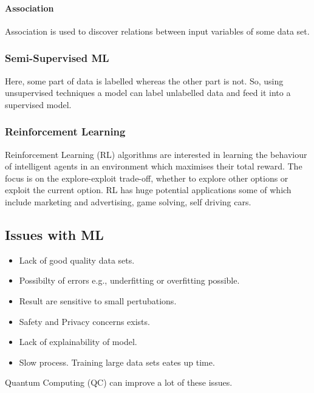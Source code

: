 \paragraph{Association}
Association is used to discover relations between input variables of some data set.
\subsubsection{Semi-Supervised ML}
Here, some part of data is labelled whereas the other part is not. So, using unsupervised techniques a model can label unlabelled data and feed it into a supervised model.
\subsubsection{Reinforcement Learning}
Reinforcement Learning (RL) algorithms are interested in learning the behaviour of intelligent agents in an environment which maximises their total reward. The focus is on the explore-exploit trade-off, whether to explore other options or exploit the current option. RL has huge potential applications some of which include marketing and advertising, game solving, self driving cars.
\subsection{Issues with ML}
\begin{itemize}
	\item Lack of good quality data sets.
	\item Possibilty of errors e.g., underfitting or overfitting possible.
	\item Result are sensitive to small pertubations.
	\item Safety and Privacy concerns exists.
	\item Lack of explainability of model.
	\item Slow process. Training large data sets eates up time.
\end{itemize}
Quantum Computing (QC) can improve a lot of these issues.